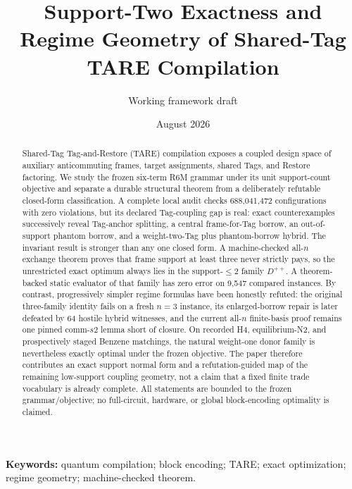\documentclass[11pt]{article}
\title{Support-Two Exactness and Regime Geometry of Shared-Tag TARE Compilation}
\author{Working framework draft}
\date{August 2026}
\begin{document}
\maketitle

\begin{abstract}
Shared-Tag Tag-and-Restore (TARE) compilation exposes a coupled design space of auxiliary anticommuting frames, target assignments, shared Tags, and Restore factoring. We study the frozen six-term R6M grammar under its unit support-count objective and separate a durable structural theorem from a deliberately refutable closed-form classification. A complete local audit checks 688,041,472 configurations with zero violations, but its declared Tag-coupling gap is real: exact counterexamples successively reveal Tag-anchor splitting, a central frame-for-Tag borrow, an out-of-support phantom borrow, and a weight-two-Tag plus phantom-borrow hybrid. The invariant result is stronger than any one closed form. A machine-checked all-$n$ exchange theorem proves that frame support at least three never strictly pays, so the unrestricted exact optimum always lies in the support-$\leq2$ family $D^{++}$. A theorem-backed static evaluator of that family has zero error on 9,547 compared instances. By contrast, progressively simpler regime formulas have been honestly refuted: the original three-family identity fails on a fresh $n=3$ instance, its enlarged-borrow repair is later defeated by 64 hostile hybrid witnesses, and the current all-$n$ finite-basis proof remains one pinned comm-$s2$ lemma short of closure. On recorded H4, equilibrium-N2, and prospectively staged Benzene matchings, the natural weight-one donor family is nevertheless exactly optimal under the frozen objective. The paper therefore contributes an exact support normal form and a refutation-guided map of the remaining low-support coupling geometry, not a claim that a fixed finite trade vocabulary is already complete. All statements are bounded to the frozen grammar/objective; no full-circuit, hardware, or global block-encoding optimality is claimed.
\end{abstract}

\noindent\textbf{Keywords:} quantum compilation; block encoding; TARE; exact optimization; regime geometry; machine-checked theorem.













\end{document}
